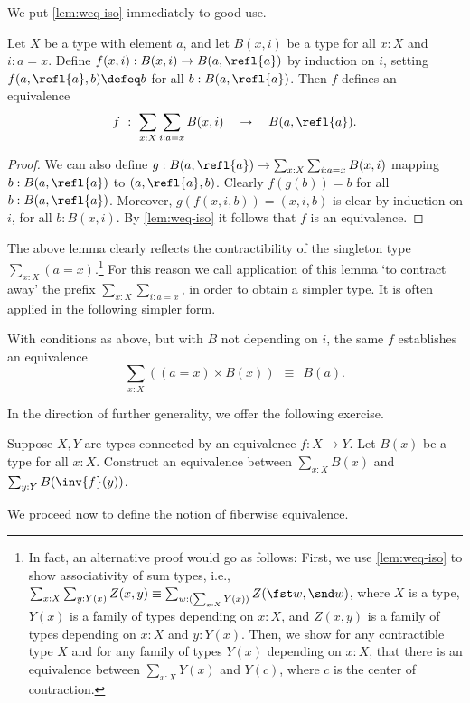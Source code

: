 We put \cref{lem:weq-iso} immediately to good use.

\begin{lemma}\label{lem:contract-away}
Let $X$ be a type with element $a$, and let
$B(x,i)$ be a type for all $x:X$ and $i: a=x$.
Define $f(x,i): B(x,i) \to B(a,\refl{a})$ by induction on $i$,
setting $f(a,\refl{a},b) \defeq b$ for all $b:B(a,\refl{a})$.
Then $f$ defines an equivalence
\[
f~:~ \sum_{x:X} \sum_{i: a=x} B(x,i) \quad \to \quad B(a,\refl{a}).
\]
\end{lemma}
\begin{proof}
We can also define
$g: B(a,\refl{a})\to \sum_{x:X} \sum_{i: a=x} B(x,i)$
mapping $b: B(a,\refl{a})$ to $(a,\refl{a},b)$.
Clearly $f(g(b))=b$ for all $b:B(a,\refl{a})$.
Moreover, $g(f(x,i,b))=(x,i,b)$ is clear by induction
on $i$, for all $b:B(x,i)$.
By \cref{lem:weq-iso} it follows that $f$
is an equivalence.
\end{proof}

The above lemma clearly reflects the  contractibility of the
singleton type $\sum_{x:X}(a=x)$.\footnote{%
  In fact, an alternative proof would go as follows:
  First, we use \cref{lem:weq-iso} to show associativity of sum types,
  i.e., $\sum_{x:X}\sum_{y:Y(x)}Z(x,y)
  \equiv \sum_{w : (\sum_{x:X}Y(x))}Z(\fst w,\snd w)$,
  where $X$ is a type,
  $Y(x)$ is a family of types depending on $x:X$,
  and $Z(x,y)$ is a family of types depending on $x:X$ and $y:Y(x)$.
  Then, we show for any contractible type $X$
  and for any family of types $Y(x)$ depending on $x:X$,
  that there is an equivalence between $\sum_{x:X}Y(x)$ and $Y(c)$,
  where $c$ is the center of contraction.}
For this reason
we call application of this lemma `to contract away'
the prefix $\sum_{x:X} \sum_{i: a=x}$, in order
to obtain a simpler type. It is often applied
in the following simpler form.

\begin{corollary}\label{cor:contract-away}
With conditions as above, but with $B$ not depending on $i$, the same $f$
establishes an equivalence
\[
 \sum_{x:X} ((a=x)\times B(x))~~\equiv~~B(a).
\]
\end{corollary}

In the direction of further generality, we offer the following exercise.
\begin{xca}\label{xca:sum-equiv-base}
  Suppose $X,Y$ are types connected by an equivalence $f : X \to Y$.
  Let $B(x)$ be a type for all $x:X$. Construct an equivalence between
  $\sum_{x:X}B(x)$ and $\sum_{y:Y}B(\inv{f}(y))$.
\end{xca}
We proceed now to define the notion of fiberwise equivalence.

